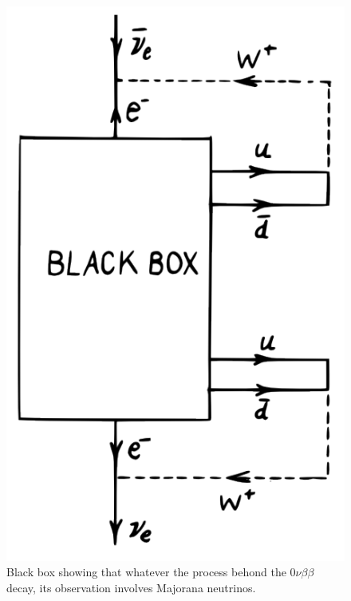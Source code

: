 \documentclass[main.tex]{subfiles}
\begin{document}
\begin{figure}[h!]
\begin{center}
\includegraphics[scale=0.30]{pictures/Chap2/blackBox.png}
\caption{Black box showing that whatever the process behond the 0$\nu\beta\beta$ decay, its observation involves Majorana neutrinos.}
\label{blackBox}
\end{center}
\end{figure}
\end{document}
